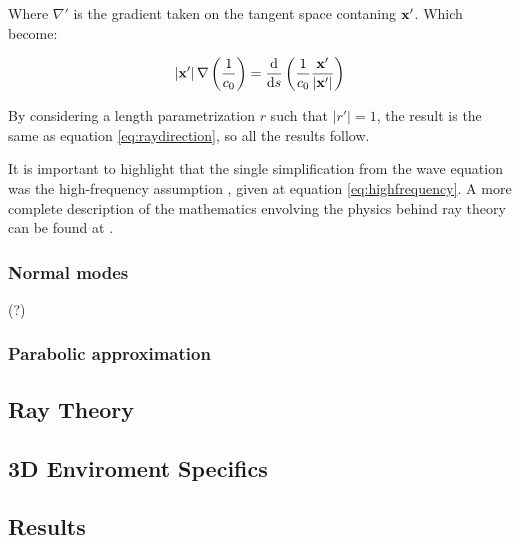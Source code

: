 Where $\nabla'$ is the gradient taken on the tangent space contaning
$\mathrm{\mathbf{x}}'$. Which become:

\begin{equation*}
\left|\mathrm{\mathbf{x}}'\right|\nabla\left(\frac{1}{c_0}\right) =
\frac{\mathrm{d}}{\mathrm{d} s}\left( \frac{1}{c_0} \frac{\mathrm{\mathbf{x}}'}{\left|\mathrm{\mathbf{x}}'\right|}\right)
\end{equation*}

By considering a length parametrization $r$ such that $\left|r'\right|=1$, the
result is the same as equation \ref{eq:raydirection}, so all the results follow.

It is important to highlight that the single simplification from the wave
equation was the high-frequency assumption \cite{national1969physics}, given at
equation \ref{eq:highfrequency}. A more complete description of the mathematics
envolving the physics behind ray theory can be found at \citet{Lefebvre}.


\subsubsection{Normal modes} \cite{Etter2013}(?)
\subsubsection{Parabolic approximation} \cite{LURTON}

\subsection{Ray Theory}
\label{ss:raytheory}
\subsection{3D Enviroment Specifics}
\subsection{Results}
